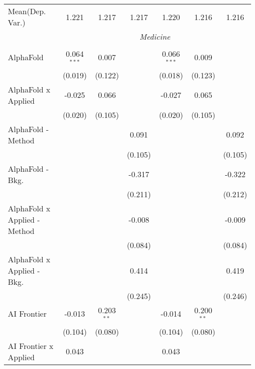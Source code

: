 \begin{tabular}{lcccccc}
Mean(Dep. Var.) & 1.221 & 1.217 & 1.217 & 1.220 & 1.216 & 1.216 \\
 & \multicolumn{6}{c}{\textit{Medicine}} \\ \\
   AlphaFold                    & 0.064$^{***}$ & 0.007        &               & 0.066$^{***}$ & 0.009        &   \\   
                                & (0.019)       & (0.122)      &               & (0.018)       & (0.123)      &   \\   
   AlphaFold x Applied          & -0.025        & 0.066        &               & -0.027        & 0.065        &   \\   
                                & (0.020)       & (0.105)      &               & (0.020)       & (0.105)      &   \\   
   AlphaFold - Method           &               &              & 0.091         &               &              & 0.092\\   
                                &               &              & (0.105)       &               &              & (0.105)\\   
   AlphaFold - Bkg.             &               &              & -0.317        &               &              & -0.322\\   
                                &               &              & (0.211)       &               &              & (0.212)\\   
   AlphaFold x Applied - Method &               &              & -0.008        &               &              & -0.009\\   
                                &               &              & (0.084)       &               &              & (0.084)\\   
   AlphaFold x Applied - Bkg.   &               &              & 0.414         &               &              & 0.419\\   
                                &               &              & (0.245)       &               &              & (0.246)\\   
   AI Frontier                  & -0.013        & 0.203$^{**}$ &               & -0.014        & 0.200$^{**}$ &   \\   
                                & (0.104)       & (0.080)      &               & (0.104)       & (0.080)      &   \\   
   AI Frontier x Applied        & 0.043         &              &               & 0.043         &              &   \\   

\end{tabular}
